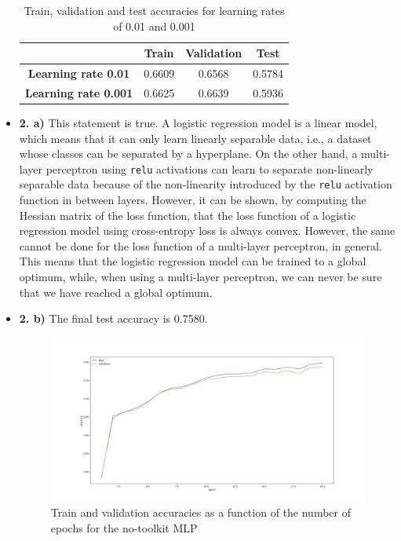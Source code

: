 \documentclass[12pt]{article}
\begin{document}
\begin{itemize}
          \begin{table}[H]
              \centering
              \begin{tabular}{|c|c|c|c|}
                  \toprule
                                               & \textbf{Train} & \textbf{Validation} & \textbf{Test} \\
                  \midrule
                  \textbf{Learning rate 0.01}  & 0.6609         & 0.6568              & 0.5784        \\
                  \textbf{Learning rate 0.001} & 0.6625         & 0.6639              & 0.5936        \\
                  \bottomrule
              \end{tabular}
              \label{tab:1.1b}
              \caption{Train, validation and test accuracies for learning rates of 0.01 and 0.001}
          \end{table}

    \item \textbf{2. a)} This statement is true. A logistic regression model is a linear model, which means that it can only learn linearly separable data, i.e., a dataset whose classes can be separated by a hyperplane. On the other hand, a multi-layer perceptron using \texttt{relu} activations can learn to separate non-linearly separable data because of the non-linearity introduced by the \texttt{relu} activation function in between layers. However, it can be shown, by computing the Hessian matrix of the loss function, that the loss function of a logistic regression model using cross-entropy loss is always convex. However, the same cannot be done for the loss function of a multi-layer perceptron, in general. This means that the logistic regression model can be trained to a global optimum, while, when using a multi-layer perceptron, we can never be sure that we have reached a global optimum.

    \item \textbf{2. b)} The final test accuracy is 0.7580.
          \begin{figure}[H]
              \centering
              \includegraphics[width=1\linewidth]{../outputs/hw1-q1-2b.001-acc.png}
              \caption{Train and validation accuracies as a function of the number of epochs for the no-toolkit MLP}
              \label{fig:1.2b:acc}
          \end{figure}


\end{itemize}
\end{document}
